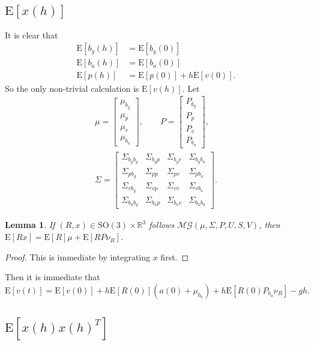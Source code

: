 \documentclass[10pt]{article}
\newtheorem{lemma}{Lemma}
\newcommand{\expect}[1]{\ensuremath{\mathrm{E}\left[ #1 \right]}}
\newcommand{\SO}{\ensuremath{\mathrm{SO(3)}}}
\newcommand{\real}[1]{\ensuremath{\mathbb{R}^{ #1 }}}
\begin{document}
\subsection{$\expect{x(h)}$}
It is clear that
\begin{align*}
	\expect{b_g(h)} &= \expect{b_g(0)} \\
	\expect{b_a(h)} &= \expect{b_a(0)} \\
	\expect{p(h)} &= \expect{p(0)}+h\expect{v(0)}.
\end{align*}
So the only non-trivial calculation is $\expect{v(h)}$.
Let
\begin{gather*}
	\mu = \begin{bmatrix}
		\mu_{b_g} \\ \mu_p \\ \mu_v \\ \mu_{b_a}
	\end{bmatrix}, \qquad
	P = \begin{bmatrix}
		P_{b_g} \\ P_p \\ P_v \\ P_{b_a}
	\end{bmatrix}, \\
	\Sigma = \begin{bmatrix}
		\Sigma_{b_gb_g} & \Sigma_{b_gp} & \Sigma_{b_gv} & \Sigma_{b_gb_a} \\
		\Sigma_{pb_g} & \Sigma_{pp} & \Sigma_{pv} & \Sigma_{pb_a} \\
		\Sigma_{vb_g} & \Sigma_{vp} & \Sigma_{vv} & \Sigma_{vb_a} \\
		\Sigma_{b_ab_g} & \Sigma_{b_ap} & \Sigma_{b_av} & \Sigma_{b_ab_a}
	\end{bmatrix}.
\end{gather*}

\begin{lemma}
	If $(R,x)\in\SO\times\real{3}$ follows $\mathcal{MG}(\mu,\Sigma,P,U,S,V)$, then $\expect{Rx} = \expect{R}\mu + \expect{RP\nu_R}$.
\end{lemma}
\begin{proof}
	This is immediate by integrating $x$ first.
\end{proof}

Then it is immediate that
\begin{equation}
	\expect{v(t)} = \expect{v(0)} + h\expect{R(0)}(a(0)+\mu_{b_a}) + h\expect{R(0)P_{b_a}\nu_R} - gh.
\end{equation}

\subsection{$\expect{x(h)x(h)^T}$}
\end{document}
